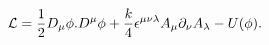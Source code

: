 \begin{equation} {\cal L}=\frac{1}{2}D_\mu \phi.D^\mu
\phi+\frac{k}{4}\epsilon^{\mu\nu\lambda}A_\mu \partial_\nu
A_\lambda -U(\phi). \end{equation}

